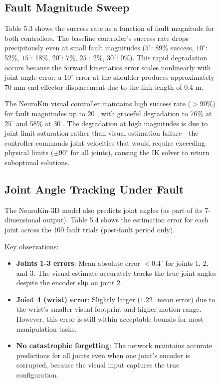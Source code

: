 \documentclass[12pt,a4paper,oneside]{report}
\begin{document}
\begin{figure}[H]
\subsection{Fault Magnitude Sweep}

Table 5.3 shows the success rate as a function of fault magnitude for both controllers. The baseline controller's success rate drops precipitously even at small fault magnitudes ($5^\circ$: 89\% success, $10^\circ$: 52\%, $15^\circ$: 18\%, $20^\circ$: 7\%, $25^\circ$: 2\%, $30^\circ$: 0\%). This rapid degradation occurs because the forward kinematics error scales nonlinearly with joint angle error; a $10^\circ$ error at the shoulder produces approximately 70 mm end-effector displacement due to the link length of 0.4 m.

The NeuroKin visual controller maintains high success rate ($>90\%$) for fault magnitudes up to $20^\circ$, with graceful degradation to 76\% at $25^\circ$ and 58\% at $30^\circ$. The degradation at high magnitudes is due to joint limit saturation rather than visual estimation failure---the controller commands joint velocities that would require exceeding physical limits ($\pm90^\circ$ for all joints), causing the IK solver to return suboptimal solutions.

\subsection{Joint Angle Tracking Under Fault}

The NeuroKin-3D model also predicts joint angles (as part of its 7-dimensional output). Table 5.4 shows the estimation error for each joint across the 100 fault trials (post-fault period only).

Key observations:
\begin{itemize}
    \item \textbf{Joints 1-3 errors}: Mean absolute error $<0.4^\circ$ for joints 1, 2, and 3. The visual estimate accurately tracks the true joint angles despite the encoder slip on joint 2.
    \item \textbf{Joint 4 (wrist) error}: Slightly larger ($1.22^\circ$ mean error) due to the wrist's smaller visual footprint and higher motion range. However, this error is still within acceptable bounds for most manipulation tasks.
    \item \textbf{No catastrophic forgetting}: The network maintains accurate predictions for all joints even when one joint's encoder is corrupted, because the visual input captures the true configuration.
\end{itemize}


\end{figure}
\end{document}
